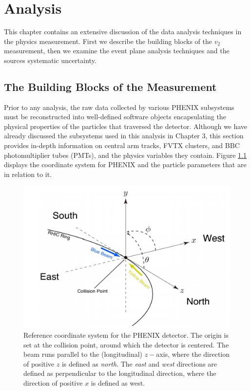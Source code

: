 \chapter{Analysis}
This chapter contains an extensive discussion of the data analysis techniques in the physics measurement. First we describe the building blocks of the  $v_2$ measurement, then we examine the event plane analysis techniques and the sources systematic uncertainty.
\section{The Building Blocks of the Measurement}
Prior to any analysis, the raw data collected by various PHENIX subsystems must be reconstructed into well-defined software objects encapsulating the physical properties of the particles that traversed the detector. Although we have already discussed the subsystems used in this analysis in Chapter 3, this section provides in-depth information on central arm tracks, FVTX clusters, and BBC photomultiplier tubes (PMTs), and the physics variables they contain. Figure \ref{fig:phenix_coord_system} displays the coordinate system for PHENIX and the particle parameters that are in relation to it.


\begin{figure}[!ht]
\begin{center}
\includegraphics[width=0.55\linewidth]{figs/phenix_coord.png}
\caption{Reference coordinate system for the PHENIX detector. The origin is set at the collision point, around which the detector is centered. The beam runs parallel to the (longitudinal) $z-$axis, where the direction of positive $z$ is defined as \emph{north}. The \emph{east} and \emph{west} directions are defined as perpendicular to the longitudinal direction, where the direction of positive $x$ is defined as west.}
\label{fig:phenix_coord_system}
\end{center}
\end{figure}

